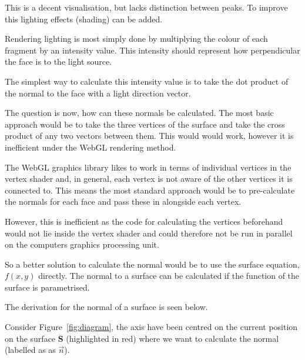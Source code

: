 \documentclass{article} %
\begin{document}
 This is a decent visualisation, but lacks distinction between peaks. To improve this lighting effects (shading) can be added.

 Rendering lighting is most simply done by multiplying the colour of each fragment by an intensity value. This intensity should represent how perpendicular the face is to the light source.

 The simplest way to calculate this intensity value is to take the dot product of the normal to the face with a light direction vector.

 The question is now, how can these normals be calculated. The most basic approach would be to take the three vertices of the surface and take the cross product of any two vectors between them. This would would work, however it is inefficient under the WebGL rendering method.

 The WebGL graphics library likes to work in terms of individual vertices in the vertex shader and, in general, each vertex is not aware of the other vertices it is connected to. This means the most standard approach would be to pre-calculate the normals for each face and pass these in alongside each vertex.

 However, this is inefficient as the code for calculating the vertices beforehand would not lie inside the vertex shader and could therefore not be run in parallel on the computers graphics processing unit.

 So a better solution to calculate the normal would be to use the surface equation, $f(x,y)$ directly. The normal to a surface can be calculated if the function of the surface is parametrised.

 The derivation for the normal of a surface is seen below.

 Consider Figure~\ref{fig:diagram}, the axis have been centred on the current position on the surface $\textbf{S}$ (highlighted in red) where we want to calculate the normal (labelled as as $\vec{n}$).
\end{document}
